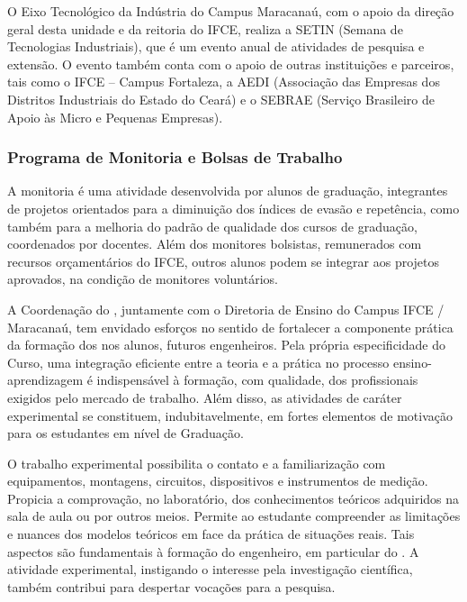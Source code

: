 \documentclass{paper}
\begin{document}

O Eixo Tecnológico da Indústria do Campus Maracanaú, com o apoio da direção geral desta unidade e da reitoria do IFCE, realiza a SETIN (Semana de Tecnologias Industriais), que é um evento anual de atividades de pesquisa e extensão. O evento também conta com o apoio de outras instituições e parceiros, tais como o IFCE – Campus Fortaleza, a AEDI (Associação das Empresas dos Distritos Industriais do Estado do Ceará) e o SEBRAE (Serviço Brasileiro de Apoio às Micro e Pequenas Empresas).


\subsubsection{Programa de Monitoria e Bolsas de Trabalho}

A monitoria é uma atividade desenvolvida por alunos de graduação, integrantes de projetos orientados para a diminuição dos índices de evasão e repetência, como também para a melhoria do padrão de qualidade dos cursos de graduação, coordenados por docentes. Além dos monitores bolsistas, remunerados com recursos orçamentários do IFCE, outros alunos podem se integrar aos projetos aprovados, na condição de monitores voluntários.

A Coordenação do \NOMECURSO, juntamente com o Diretoria de Ensino do Campus IFCE / Maracanaú, tem envidado esforços no sentido de fortalecer a componente prática da formação dos nos alunos, futuros engenheiros. Pela própria especificidade do Curso, uma integração eficiente entre a teoria e a prática no processo ensino-aprendizagem é indispensável à formação, com qualidade, dos profissionais exigidos pelo mercado de trabalho. Além disso, as atividades de caráter experimental se constituem, indubitavelmente, em fortes elementos de motivação para os estudantes em nível de Graduação.

O trabalho experimental possibilita o contato e a familiarização com equipamentos, montagens, circuitos, dispositivos e instrumentos de medição. Propicia a comprovação, no laboratório, dos conhecimentos teóricos adquiridos na sala de aula ou por outros meios. Permite ao estudante compreender as limitações e nuances dos modelos teóricos em face da prática de situações reais. Tais aspectos são fundamentais à formação do engenheiro, em particular do \NOMEEGRESSO. A atividade  experimental, instigando o interesse pela investigação científica, também contribui para despertar vocações para a pesquisa.
\end{document}
